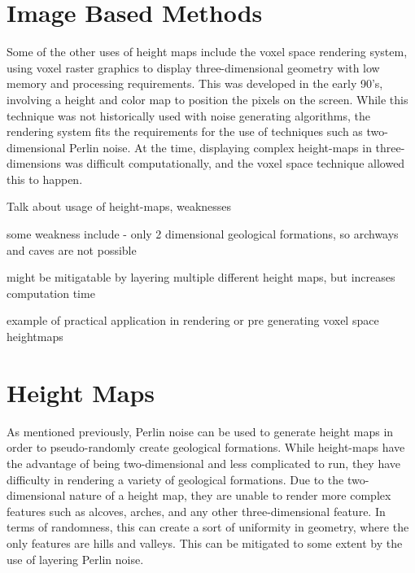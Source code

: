 \documentclass[10pt]{report}
\begin{document}
		
		
		
		
	\vspace{10pt}
	\let\clearpage\relax
	\chapter{Image Based Methods}
	
		Some of the other uses of height maps include the voxel space rendering system, using voxel raster graphics to display three-dimensional geometry with low memory and processing requirements. This was developed in the early 90's, involving a height and color map to position the pixels on the screen. While this technique was not historically used with noise generating algorithms, the rendering system fits the requirements for the use of techniques such as two-dimensional Perlin noise. At the time, displaying complex height-maps in three-dimensions was difficult computationally, and the voxel space technique allowed this to happen. 
		
		Talk about usage of height-maps, weaknesses
		
		some weakness include - only 2 dimensional geological formations, so archways and caves are not possible
		
		might be mitigatable by layering multiple different height maps, but increases computation time
		
		example of practical application in rendering or pre generating voxel space heightmaps
	
	\vspace{10pt}
	\let\clearpage\relax
	\chapter{Height Maps}
	
		As mentioned previously, Perlin noise can be used to generate height maps in order to pseudo-randomly create geological formations. While height-maps have the advantage of being two-dimensional and less complicated to run, they have difficulty in rendering a variety of geological formations. Due to the two-dimensional nature of a height map, they are unable to render more complex features such as alcoves, arches, and any other three-dimensional feature. In terms of randomness, this can create a sort of uniformity in geometry, where the only features are hills and valleys. This can be mitigated to some extent by the use of layering Perlin noise.
		
\end{document}
